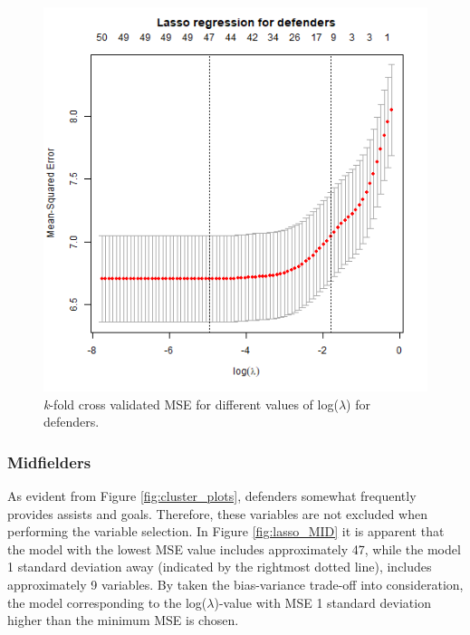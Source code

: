 \begin{figure}[H]
    \centering
    \includegraphics[scale=0.55]{fig/chapter_6/lasso_DEF.png}
    \caption{\textit{k}-fold cross validated MSE for different values of log($\lambda$) for defenders.}
\label{fig:lasso_DEF}    
\end{figure}

\subsubsection{Midfielders}
As evident from Figure \ref{fig:cluster_plots}, defenders somewhat frequently provides assists and goals. Therefore, these variables are not excluded when performing the variable selection. In Figure \ref{fig:lasso_MID} it is apparent that the model with the lowest MSE value includes approximately 47, while the model 1 standard deviation away (indicated by the rightmost dotted line), includes approximately 9 variables. By taken the bias-variance trade-off into consideration, the model corresponding to the log($\lambda$)-value with MSE 1 standard deviation higher than the minimum MSE is chosen.

